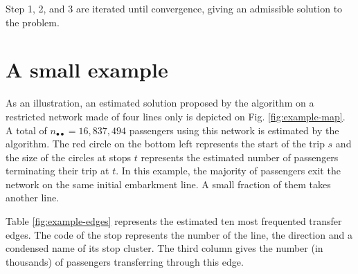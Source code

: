 \documentclass{llncs}
\begin{document}
Step 1, 2, and 3 are iterated until convergence, giving an admissible solution to the problem.
%
\section{A small example}
%

As an illustration, an estimated solution proposed by the algorithm on a restricted network made of four lines only is depicted on Fig. \ref{fig:example-map}. A total of $n_{\bullet \bullet} = 16,837,494$ passengers using this network is estimated by the algorithm. The red circle on the bottom left represents the start of the trip $s$ and the size of the circles at stops $t$ represents the estimated number of passengers terminating their trip at $t$. In this example, the majority of passengers exit the network on the same initial embarkment line. A small fraction of them takes another line. 

Table \ref{fig:example-edges} represents the estimated ten most frequented transfer edges. The code of the stop represents the number of the line, the direction and a condensed name of its stop cluster. The third column gives the number (in thousands) of passengers transferring through this edge.
\end{document}
